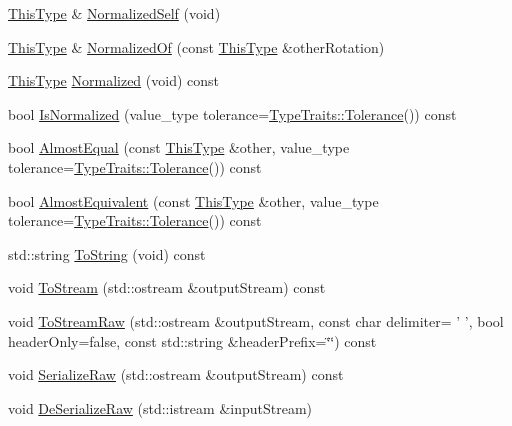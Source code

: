 \begin{DoxyCompactItemize}
\hyperlink{classvct_axis_angle_rotation3_af654a8037b7b82a378f69cb1bfd9b8dd}{This\-Type} \& \hyperlink{classvct_axis_angle_rotation3_a37ddf9e48a259ffbf6f1beddcadf2aed}{Normalized\-Self} (void)
\item 
\hyperlink{classvct_axis_angle_rotation3_af654a8037b7b82a378f69cb1bfd9b8dd}{This\-Type} \& \hyperlink{classvct_axis_angle_rotation3_a9ab57a20a5831e8a46abf161e89d9e05}{Normalized\-Of} (const \hyperlink{classvct_axis_angle_rotation3_af654a8037b7b82a378f69cb1bfd9b8dd}{This\-Type} \&other\-Rotation)
\item 
\hyperlink{classvct_axis_angle_rotation3_af654a8037b7b82a378f69cb1bfd9b8dd}{This\-Type} \hyperlink{classvct_axis_angle_rotation3_a116569ba3bfefa865eaa77f47e437a4f}{Normalized} (void) const 
\item 
bool \hyperlink{classvct_axis_angle_rotation3_a8ce58b2c95cf2abbb6e4244c5837f46d}{Is\-Normalized} (value\-\_\-type tolerance=\hyperlink{classcmn_type_traits_adc129bf9867295b90d300768b780fa99}{Type\-Traits\-::\-Tolerance}()) const 
\item 
bool \hyperlink{classvct_axis_angle_rotation3_a1551351754cb3255404e61e04828d5e0}{Almost\-Equal} (const \hyperlink{classvct_axis_angle_rotation3_af654a8037b7b82a378f69cb1bfd9b8dd}{This\-Type} \&other, value\-\_\-type tolerance=\hyperlink{classcmn_type_traits_adc129bf9867295b90d300768b780fa99}{Type\-Traits\-::\-Tolerance}()) const 
\item 
bool \hyperlink{classvct_axis_angle_rotation3_af333432bd09bebbce7334e23d9e0d637}{Almost\-Equivalent} (const \hyperlink{classvct_axis_angle_rotation3_af654a8037b7b82a378f69cb1bfd9b8dd}{This\-Type} \&other, value\-\_\-type tolerance=\hyperlink{classcmn_type_traits_adc129bf9867295b90d300768b780fa99}{Type\-Traits\-::\-Tolerance}()) const 
\item 
std\-::string \hyperlink{classvct_axis_angle_rotation3_a21face93472a7d62f8f9065d609cfe32}{To\-String} (void) const 
\item 
void \hyperlink{classvct_axis_angle_rotation3_acbda7447118bc35acbb77b0de1c4cfa7}{To\-Stream} (std\-::ostream \&output\-Stream) const 
\item 
void \hyperlink{classvct_axis_angle_rotation3_a19187b14336ba6721c158f42a8eeee0e}{To\-Stream\-Raw} (std\-::ostream \&output\-Stream, const char delimiter= ' ', bool header\-Only=false, const std\-::string \&header\-Prefix=\char`\"{}\char`\"{}) const 
\item 
void \hyperlink{classvct_axis_angle_rotation3_a9ae280f8e1ea64146875bc7ab4d9648f}{Serialize\-Raw} (std\-::ostream \&output\-Stream) const 
\item 
void \hyperlink{classvct_axis_angle_rotation3_a1365204e692b40572f0996a38551c2c3}{De\-Serialize\-Raw} (std\-::istream \&input\-Stream)
\end{DoxyCompactItemize}

